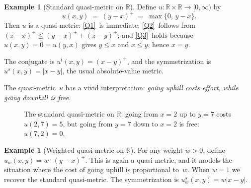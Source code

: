 \documentclass[11pt,a4paper]{article}
\theoremstyle{plain}
\theoremstyle{definition}
\newtheorem{exampleinner}[theoreminner]{Example}
\newenvironment{example}[1][]{\begin{exampleinner}[#1]}{\end{exampleinner}}
\newcommand{\R}{\mathbb{R}}
\begin{document}
\begin{example}[Standard quasi-metric on $\R$]\label{ex:standard-qm}
Define $u\colon\R\times\R\to[0,\infty)$ by
\[
  u(x,y) \;=\; (y-x)^+ \;=\; \max\{0,\,y-x\}.
\]
Then $u$ is a quasi-metric:  \ref{Q1}~is immediate; \ref{Q2}~follows
from $(z-x)^+\le(y-x)^++(z-y)^+$; and \ref{Q3}~holds because
$u(x,y)=0=u(y,x)$ gives $y\le x$ and $x\le y$, hence $x=y$.

The conjugate is $u^t(x,y)=(x-y)^+$, and the symmetrization is
$u^s(x,y)=|x-y|$, the usual absolute-value metric.
\end{example}

The quasi-metric~$u$ has a vivid interpretation: \emph{going uphill
costs effort, while going downhill is free.}

\begin{figure}[H]
\centering
{}
\caption{The standard quasi-metric on $\R$: going from $x=2$ up to
$y=7$ costs $u(2,7)=5$, but going from $y=7$ down to $x=2$ is free:
$u(7,2)=0$.}
\label{fig:standard-qm}
\end{figure}

\begin{example}[Weighted quasi-metric on $\R$]\label{ex:weighted-qm}
For any weight $w>0$, define $u_w(x,y)=w\cdot(y-x)^+$.  This is
again a quasi-metric, and it models the situation where the cost of
going uphill is proportional to~$w$.  When $w=1$ we recover the
standard quasi-metric.  The symmetrization is $u_w^s(x,y)=w|x-y|$.
\end{example}
\end{document}

